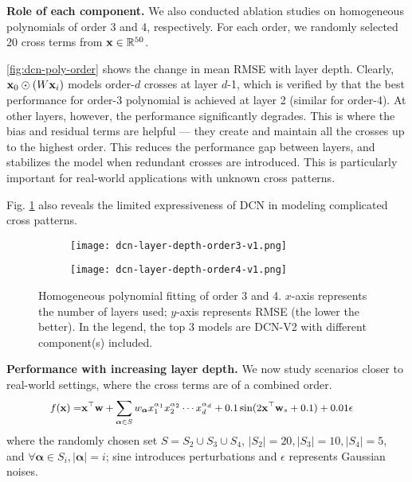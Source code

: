 \documentclass[sigconf]{acmart}
\newcommand{\vecx}{{\bf x}}
\newcommand{\vecw}{{\bf w}}
\newcommand{\vecalpha}{{\bm \alpha}}
\begin{document}
{\bf Role of each component.}
We also conducted ablation studies on homogeneous polynomials of order 3 and 4, respectively. For each order, we randomly selected 20 cross terms from $\vecx \in \mathbb{R}^{50}$.

\autoref{fig:dcn-poly-order} shows the change in mean RMSE with layer depth. Clearly, $\vecx_0 \odot (W\vecx_i)$ models order-$d$ crosses at layer $d$-1, which is verified by that the best performance for order-3 polynomial is achieved at layer 2 (similar for order-4). At other layers, however, the performance significantly degrades. This is where the bias and residual terms are helpful --- they create and maintain all the crosses up to the highest order. This reduces the performance gap between layers, and stabilizes the model when redundant crosses are introduced. This is particularly important for real-world applications with unknown cross patterns.

Fig. \ref{fig:dcn-poly-order} also reveals the limited expressiveness of {DCN} in modeling complicated cross patterns.


\begin{figure}[htbp]
\centering
    \begin{subfigure}[b]{0.22\textwidth}  
    \texttt{[image: dcn-layer-depth-order3-v1.png]}
    \end{subfigure}
    \hfill
    \begin{subfigure}[b]{0.208\textwidth}  
    \texttt{[image: dcn-layer-depth-order4-v1.png]}
    \end{subfigure}
    \vspace{-1ex}
    \caption{Homogeneous polynomial fitting of order 3 and 4. $x$-axis represents the number of layers used; $y$-axis represents RMSE (the lower the better). In the legend, the top 3 models are {DCN-V2} with different component(s) included.}
\label{fig:dcn-poly-order}
\end{figure}

{\bf Performance with increasing layer depth.} We now study scenarios closer to real-world settings, where the cross terms are of a combined order.  
\begin{equation*}
\small
    \label{eq:combined-order}
    \begin{split}
    f(\vecx) = & \vecx^\top \vecw + 
\sum_{\vecalpha \in S} w_{\vecalpha} x_1^{\alpha_1}x_2^{\alpha_2}\cdots x_d^{\alpha_d}  +
0.1 \sin(2\vecx^\top \vecw_{s} + 0.1) +
0.01 \epsilon
    \end{split}
\end{equation*}
where the randomly chosen set $S = S_2 \cup S_3 \cup S_4$, $|S_2|=20, |S_3|=10, |S_4|=5$, and $\forall \vecalpha \in S_i, |\vecalpha|=i$; sine introduces perturbations and $\epsilon$ represents Gaussian noises.
\end{document}
